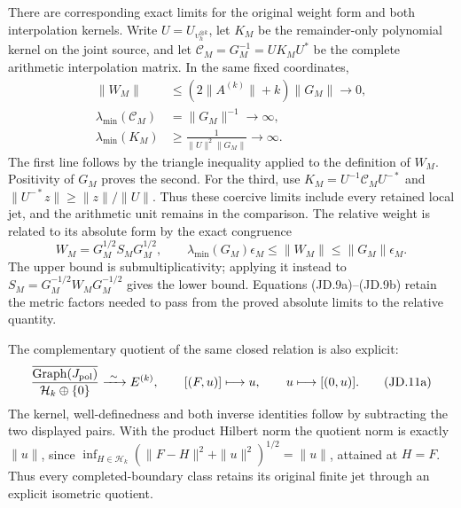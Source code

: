 There are corresponding exact limits for the original weight form
and both interpolation kernels.  Write \(U=U_{\upsilon_h^{\otimes k}}\),
let \(K_M\) be the remainder-only polynomial kernel on the joint
source, and let \(\mathcal C_M=G_M^{-1}=UK_MU^*\) be the
complete arithmetic interpolation matrix.  In the same fixed
coordinates,
\[
 \begin{split}
 \|W_M\|&\le(2\|A^{(k)}\|+k)\|G_M\|\longrightarrow0,\\
 \lambda_{\min}(\mathcal C_M)&=\|G_M\|^{-1}
                                     \longrightarrow\infty,\\
 \lambda_{\min}(K_M)&\ge
                \frac{1}{\|U\|^2\|G_M\|}\longrightarrow\infty.
 \end{split}
 \tag{JD.9a}
\]
The first line follows by the triangle inequality applied to the
definition of \(W_M\).  Positivity of \(G_M\) proves the
second.  For the third, use
\(K_M=U^{-1}\mathcal C_MU^{-*}\) and
\(\|U^{-*}z\|\ge\|z\|/\|U\|\).  Thus these coercive
limits include every retained local jet, and the arithmetic unit
remains in the comparison.  The relative weight is related to its
absolute form by the exact congruence
\[
 W_M=G_M^{1/2}S_MG_M^{1/2},\qquad
 \lambda_{\min}(G_M)\epsilon_M
    \le\|W_M\|\le\|G_M\|\epsilon_M.
 \tag{JD.9b}
\]
The upper bound is submultiplicativity; applying it instead to
\(S_M=G_M^{-1/2}W_MG_M^{-1/2}\) gives the lower bound.
Equations (JD.9a)--(JD.9b) retain the metric factors needed to
pass from the proved absolute limits to the relative quantity.

The complementary quotient of the same closed relation is also
explicit:
\[
 \frac{\overline{\operatorname{Graph}(J_{\rm pol})}}
            {\mathcal H_k\oplus\{0\}}
 \xrightarrow{\ \sim\ }E^{(k)},\qquad
 [(F,u)]\longmapsto u,\qquad
 u\longmapsto[(0,u)].
 \tag{JD.11a}
\]
The kernel, well-definedness and both inverse identities follow by
subtracting the two displayed pairs.  With the product Hilbert norm
the quotient norm is exactly \(\|u\|\), since
\(\inf_{H\in\mathcal H_k}(\|F-H\|^2+\|u\|^2)^{1/2}=\|u\|\),
attained at \(H=F\).  Thus every completed-boundary class retains
its original finite jet through an explicit isometric quotient.


